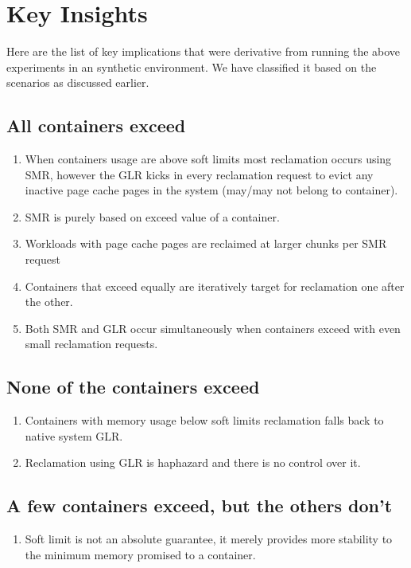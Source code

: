   
  \section{Key Insights}
    
    Here are the list of key implications that were derivative from running the above experiments in an synthetic environment. We have 
classified it based on the scenarios as discussed earlier.
    
    \subsection{All containers exceed}
    \begin{enumerate}
      \item When containers usage are above soft limits most reclamation occurs using SMR, however the GLR kicks in every reclamation 
request to evict any  inactive page cache pages in the system (may/may not belong to container).      
      \item SMR is purely based on exceed value of a container.
      \item Workloads with page cache pages are reclaimed at larger chunks per SMR request
      \item Containers that exceed equally are iteratively target for reclamation one after the other.
      \item Both SMR and GLR occur simultaneously when containers exceed with even small reclamation requests.      
    \end{enumerate}
    
    \subsection{None of the containers exceed}
    \begin{enumerate}
      \item Containers with memory usage below soft limits reclamation falls back to native system GLR.
      \item Reclamation using GLR is haphazard and there is no control over it. 
    \end{enumerate}
    
    \subsection{A few containers exceed, but the others don’t}
    \begin{enumerate}
      \item Soft limit is not an absolute guarantee, it merely provides more stability to the minimum memory promised to a container.
    \end{enumerate}

  
